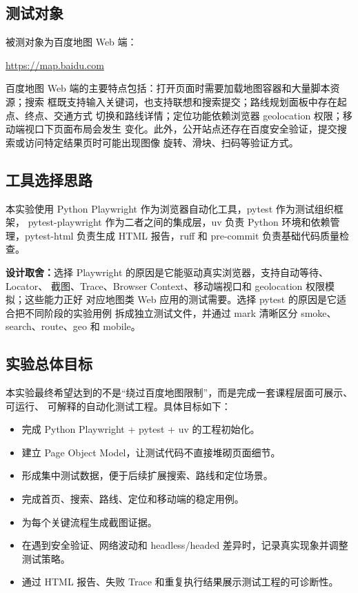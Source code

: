 \documentclass[UTF8,a4paper,12pt]{ctexart}
\newcommand{\decision}[1]{\par\noindent\textbf{设计取舍：}#1\par}
\begin{document}
\subsection{测试对象}

被测对象为百度地图 Web 端：

\begin{center}
\url{https://map.baidu.com}
\end{center}

百度地图 Web 端的主要特点包括：打开页面时需要加载地图容器和大量脚本资源；搜索
框既支持输入关键词，也支持联想和搜索提交；路线规划面板中存在起点、终点、交通方式
切换和路线详情；定位功能依赖浏览器 geolocation 权限；移动端视口下页面布局会发生
变化。此外，公开站点还存在百度安全验证，提交搜索或访问特定结果页时可能出现图像
旋转、滑块、扫码等验证方式。

\subsection{工具选择思路}

本实验使用 Python Playwright 作为浏览器自动化工具，pytest 作为测试组织框架，
pytest-playwright 作为二者之间的集成层，uv 负责 Python 环境和依赖管理，pytest-html
负责生成 HTML 报告，ruff 和 pre-commit 负责基础代码质量检查。

\decision{选择 Playwright 的原因是它能驱动真实浏览器，支持自动等待、Locator、
截图、Trace、Browser Context、移动端视口和 geolocation 权限模拟；这些能力正好
对应地图类 Web 应用的测试需要。选择 pytest 的原因是它适合把不同阶段的实验用例
拆成独立测试文件，并通过 mark 清晰区分 smoke、search、route、geo 和 mobile。}

\subsection{实验总体目标}

本实验最终希望达到的不是“绕过百度地图限制”，而是完成一套课程层面可展示、可运行、
可解释的自动化测试工程。具体目标如下：

\begin{itemize}
  \item 完成 Python Playwright + pytest + uv 的工程初始化。
  \item 建立 Page Object Model，让测试代码不直接堆砌页面细节。
  \item 形成集中测试数据，便于后续扩展搜索、路线和定位场景。
  \item 完成首页、搜索、路线、定位和移动端的稳定用例。
  \item 为每个关键流程生成截图证据。
  \item 在遇到安全验证、网络波动和 headless/headed 差异时，记录真实现象并调整
  测试策略。
  \item 通过 HTML 报告、失败 Trace 和重复执行结果展示测试工程的可诊断性。
\end{itemize}
\end{document}
